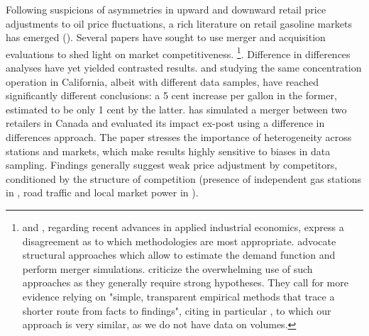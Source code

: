 \documentclass[english]{article}
\begin{document}
Following suspicions of asymmetries in upward and downward retail price adjustments to oil price fluctuations, a rich literature on retail gasoline markets has emerged (\cite{ECK13}). Several papers have sought to use merger and acquisition evaluations to shed light on market competitiveness.%
\footnote{\cite{EIN10} and \cite{ANG10}, regarding recent advances in applied industrial economics, express a disagreement as to which methodologies are most appropriate. \cite{EIN10} advocate structural approaches which allow to estimate the demand function and perform merger simulations. \cite{ANG10} criticize the overwhelming use of such approaches as they generally require strong hypotheses. They call for more evidence relying on "simple, transparent empirical methods that trace a shorter route from facts to findings", citing in particular \cite{HAS04}, to which our approach is very similar, as we do not have data on volumes.%
}. Difference in differences analyses have yet yielded contrasted results. \cite{HAS04} and \cite{TAY10} studying the same concentration operation in California, albeit with different data samples, have reached significantly different conclusions: a 5 cent increase per gallon in the former, estimated to be only 1 cent by the latter. \cite{HOU12} has simulated a merger between two retailers in Canada and evaluated its impact ex-post using a difference in differences approach. The paper stresses the importance of heterogeneity across stations and markets, which make results highly sensitive to biases in data sampling. Findings generally suggest weak price adjustment by competitors, conditioned by the structure of competition (presence of independent gas stations in \cite{HAS04}, road traffic and local market power in \cite{HOU12}).
\medskip{}
\end{document}
